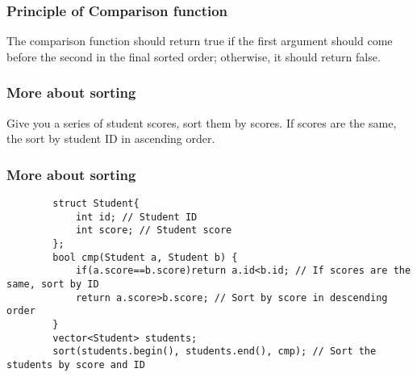 \documentclass[xcolor=dvipsnames]{beamer}
\begin{document}
    \begin{frame}
        \frametitle{Principle of Comparison function}
        The comparison function should return true if the first argument 
        should come before the second in the final sorted order; 
        otherwise, it should return false.
    \end{frame}

    \begin{frame}
        \frametitle{More about sorting}
        
        Give you a series of student scores, sort them by scores.
        If scores are the same, the sort by student ID in ascending order.

    \end{frame}
    \begin{frame}[fragile]
        \frametitle{More about sorting}
        \begin{verbatim}
        struct Student{
            int id; // Student ID
            int score; // Student score
        };
        bool cmp(Student a, Student b) {
            if(a.score==b.score)return a.id<b.id; // If scores are the same, sort by ID
            return a.score>b.score; // Sort by score in descending order
        }
        vector<Student> students;
        sort(students.begin(), students.end(), cmp); // Sort the students by score and ID
        \end{verbatim}

    \end{frame}
\end{document}
